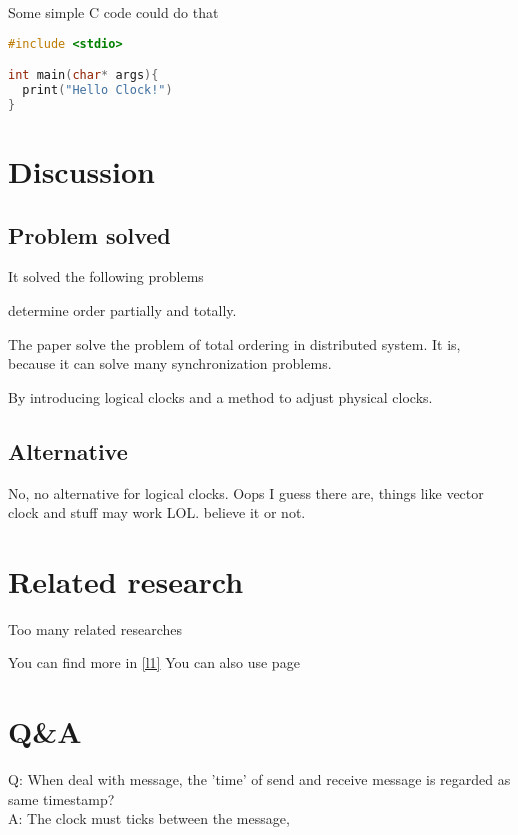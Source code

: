 \documentclass[12pt,a4paper,oneside]{article}
\begin{document}
Some simple C code could do that

\begin{lstlisting}[language=C]
#include <stdio>

int main(char* args){
  print("Hello Clock!")
}
\end{lstlisting}

\section{Discussion}

\subsection{Problem solved}

It solved the following problems

determine order partially and totally. %

The paper solve the problem of total ordering in distributed system.
It is, because it can solve many synchronization problems.

By introducing logical clocks and a method to adjust physical clocks.

\subsection{Alternative}

No, no alternative for logical clocks. Oops I guess there are, things
like vector clock and stuff may work LOL. believe it or not.

\section{Related research}


Too many related researches

You can find more in \ref{l1}
You can also use page \pageref{l1}

\section{Q\&A}

Q: When deal with message, the 'time' of send and receive message is regarded as same timestamp? \\
A: The clock must ticks between the message,  %
\end{document}
